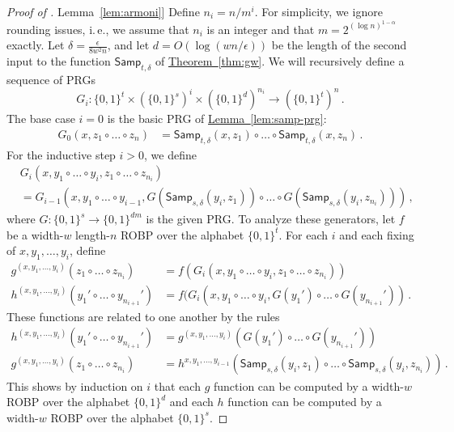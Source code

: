 \documentclass[11pt]{article}
\numberwithin{equation}{section}
\theoremstyle{definition}
\theoremstyle{plain}
\newcommand{\ie}{i.\,e.}
\newcommand{\expref}[2]{\hyperref[#2]{#1~\ref{#2}}}
\begin{document}
\begin{proof}[Proof of \expref{Lemma}{lem:armoni}]
Define $n_i = n / m^i$. For simplicity, we ignore rounding issues, \ie, we assume that $n_i$ is an integer and that $m = 2^{(\log n)^{1 - \alpha}}$ exactly. Let $\delta = \frac{\epsilon}{8w^2 n}$, and let $d = O(\log(wn/\epsilon))$ be the length of the second input to the function $\mathsf{Samp}_{t, \delta}$ of \expref{Theorem}{thm:gw}. We will recursively define a sequence of PRGs
$$
G_i \colon \{0, 1\}^t \times (\{0, 1\}^s)^i \times (\{0, 1\}^d)^{n_i} \to (\{0, 1\}^t)^n\,.
$$
The base case $i = 0$ is the basic PRG of \expref{Lemma}{lem:samp-prg}:
\begin{align*}
G_0(x, z_1 \circ \dots \circ z_n) &= \mathsf{Samp}_{t, \delta}(x, z_1) \circ \dots \circ \mathsf{Samp}_{t, \delta}(x, z_n)\,.
\end{align*}
For the inductive step $i > 0$, we define
\begin{align*}
&G_i(x, y_1 \circ \dots \circ y_i, z_1 \circ \dots \circ z_{n_i})\\
&{}= G_{i - 1}(x, y_1 \circ \dots \circ y_{i - 1}, G(\mathsf{Samp}_{s, \delta}(y_i, z_1)) \circ \dots \circ G(\mathsf{Samp}_{s, \delta}(y_i, z_{n_i})))\,,
\end{align*}
where $G \colon \{0, 1\}^s \to \{0, 1\}^{dm}$ is the given PRG. To analyze these generators, let $f$ be a width-$w$ length-$n$ ROBP over the alphabet $\{0, 1\}^t$. For each $i$ and each fixing of $x, y_1, \dots, y_i$, define
\begin{align*}
g^{(x, y_1, \dots, y_i)}(z_1 \circ \dots \circ z_{n_i}) &= f(G_i(x, y_1 \circ \dots \circ y_i, z_1 \circ \dots \circ z_{n_i})) \\
h^{(x, y_1, \dots, y_i)}(y_1' \circ \dots \circ y_{n_{i + 1}}') &= f(G_i(x, y_1 \circ \dots \circ y_i, G(y_1') \circ \dots \circ G(y_{n_{i + 1}}'))\,.
\end{align*}
These functions are related to one another by the rules
\begin{align}
h^{(x, y_1, \dots, y_i)}(y_1' \circ \dots \circ y_{n_{i + 1}}') &= g^{(x, y_1, \dots, y_i)}(G(y_1') \circ \dots \circ G(y_{n_{i + 1}}')) \label{eqn:h-from-g} \\
g^{(x, y_1, \dots, y_i)}(z_1 \circ \dots \circ z_{n_i}) &= h^{x, y_1, \dots, y_{i - 1}}(\mathsf{Samp}_{s, \delta}(y_i, z_1) \circ \dots \circ \mathsf{Samp}_{s, \delta}(y_i, z_{n_i}))\,. \label{eqn:g-from-h}
\end{align}
This shows by induction on $i$ that each $g$ function can be computed by a width-$w$ ROBP over the alphabet $\{0, 1\}^d$ and each $h$ function can be computed by a width-$w$ ROBP over the alphabet $\{0, 1\}^s$.


\end{proof}
\end{document}
